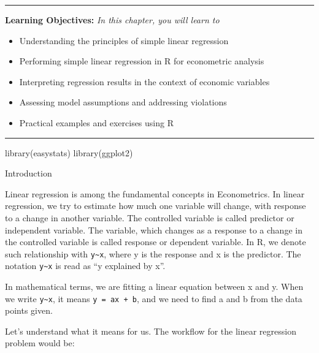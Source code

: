 \documentclass[
  letterpaper,
  twoside,
  openright,
  headsepline,
  footsepline,
  listof = totocnumbered,
  chapterprefix = true,
  titlepage = false]{scrbook}
\newenvironment{Shaded}{\begin{snugshade}}{\end{snugshade}}
\newcommand{\FunctionTok}[1]{\textcolor[rgb]{0.28,0.35,0.67}{#1}}
\newcommand{\NormalTok}[1]{\textcolor[rgb]{0.00,0.23,0.31}{#1}}
\providecommand{\abstractname}{Learning Objectives} %
\newenvironment{objectives}[1]{%
	\hrule
	\vspace{5pt}
	\small\textbf{\abstractname: } 
	\newline
	\vspace{0.1cm}
	\small\emph{#1} %
	\itshape %
}{%
	\vspace{5pt}
	\hrule
	\vspace{0.6cm}
}
\begin{document}
\begin{objectives}{In this chapter, you will learn to}
\begin{itemize}

\item{Understanding the principles of simple linear regression}

\item{Performing simple linear regression in R for econometric analysis}

\item{Interpreting regression results in the context of economic variables}

\item{Assessing model assumptions and addressing violations}

\item{Practical examples and exercises using R}

\end{itemize}

\end{objectives}

\begin{Shaded}
\begin{Highlighting}[numbers=left,,]
\FunctionTok{library}\NormalTok{(easystats)}
\FunctionTok{library}\NormalTok{(ggplot2)}
\end{Highlighting}
\end{Shaded}

Introduction

Linear regression is among the fundamental concepts in Econometrics. In
linear regression, we try to estimate how much one variable will change,
with response to a change in another variable. The controlled variable
is called predictor or independent variable. The variable, which changes
as a response to a change in the controlled variable is called response
or dependent variable. In R, we denote such relationship with
\texttt{y\textasciitilde{}x}, where y is the response and x is the
predictor. The notation \texttt{y\textasciitilde{}x} is read as ``y
explained by x''.

In mathematical terms, we are fitting a linear equation between x and y.
When we write \texttt{y\textasciitilde{}x}, it means
\texttt{y\ =\ ax\ +\ b}, and we need to find a and b from the data
points given.

Let's understand what it means for us. The workflow for the linear
regression problem would be:
\end{document}
